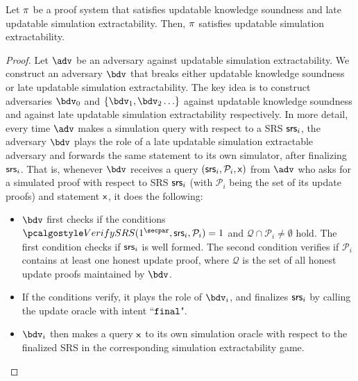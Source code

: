 \begin{lemma}
	Let $\pi$ be a proof system that satisfies updatable knowledge soundness and late updatable simulation extractability. Then, $\pi$
	satisfies updatable simulation extractability.
\end{lemma}
\begin{proof}
	Let $\advse$ be an adversary against updatable simulation extractability. We construct an adversary $\bdv$ that breaks either updatable knowledge soundness or late updatable simulation extractability.
	The key idea is to construct adversaries $\bdv_0$ and $\{\bdv_1, \bdv_2\ldots \}$ against updatable knowledge soundness and against late updatable simulation extractability respectively. 
	In more detail, every time $\advse$ makes a simulation query with respect to a SRS $\mathsf{srs}_i$, the adversary $\bdv$ plays the role of a late updatable simulation extractable adversary and forwards the same  
	statement to its own simulator, after finalizing $\mathsf{srs}_i$. 
	That is, whenever $\bdv$ receives a query $(\mathsf{srs}_i, \mathcal{P}_i, \mathsf{x})$ from $\advse$ who asks for a simulated proof with respect to SRS $\mathsf{srs}_i$ (with $\mathcal{P}_i$ being the set of its update proofs) and statement $\mathsf{x}$, it does the following: 
	
	\begin{itemize}
		\item 
		$\bdv$ first checks if the conditions
		$\verifyCRS(1^\secpar,\srs_i, \mathcal{P}_i) = 1$ and $\mathcal{Q} \cap \mathcal{P}_i \neq \emptyset$ hold. The first condition checks if $\mathsf{srs}_i$ is well formed. The second condition verifies if $\mathcal{P}_i$ contains at least
		one honest update proof, where $\mathcal{Q}$ is the set of all honest update proofs maintained by $\bdv$. 
		\item If the conditions verify, it plays the role of $\bdv_i$, and finalizes $\mathsf{srs}_i$ by calling the update oracle with intent ``$\mathtt{final}$". 
		
		\item
		$\bdv_i$ then makes a query $\mathsf{x}$ to its own simulation oracle with respect to the finalized SRS in the corresponding simulation extractability game.
		

\end{itemize}
\end{proof}
